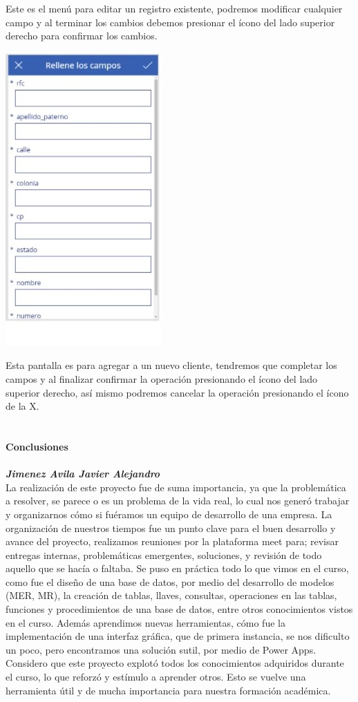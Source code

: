 \documentclass[letter,12pt]{article} %
\begin{document}
Este es el menú para editar un registro existente, podremos modificar cualquier campo y al terminar los cambios debemos presionar el ícono del lado superior derecho para confirmar los cambios.\\

\begin{center} 
\includegraphics[scale=0.45]{imagenes/A09.jpeg}
\end{center} 
Esta pantalla es para agregar a un nuevo cliente, tendremos que completar los campos y al finalizar confirmar la operación presionando el ícono del lado superior derecho, así mismo podremos cancelar la operación presionando el ícono de la X.\\\\\\
\large{ \textbf{Conclusiones}}
\\\\\textbf{\textit{Jimenez Avila Javier Alejandro}}
\\
La realización de este proyecto fue de suma importancia, ya que la problemática a resolver, se parece o es un problema de la vida real, lo cual nos generó trabajar y organizarnos cómo si fuéramos un equipo de desarrollo de una empresa. La organización de nuestros tiempos fue un punto clave para el buen desarrollo y avance del proyecto, realizamos reuniones por la plataforma meet para; revisar entregas internas, problemáticas emergentes, soluciones, y revisión de todo aquello que se hacía o faltaba. Se puso en práctica todo lo que vimos en el curso, como fue el diseño de una base de datos, por medio del desarrollo de modelos (MER, MR), la creación de tablas, llaves, consultas, operaciones en las tablas, funciones y procedimientos de una base de datos, entre otros conocimientos vistos en el curso. Además aprendimos nuevas herramientas, cómo fue la implementación de una interfaz gráfica, que de primera instancia, se nos dificulto un poco, pero encontramos una solución sutil, por medio de Power Apps. Considero que este proyecto explotó todos los conocimientos adquiridos durante el curso, lo que reforzó y estímulo a aprender otros. Esto se vuelve una herramienta útil y de mucha importancia para nuestra formación académica.
\end{document}

